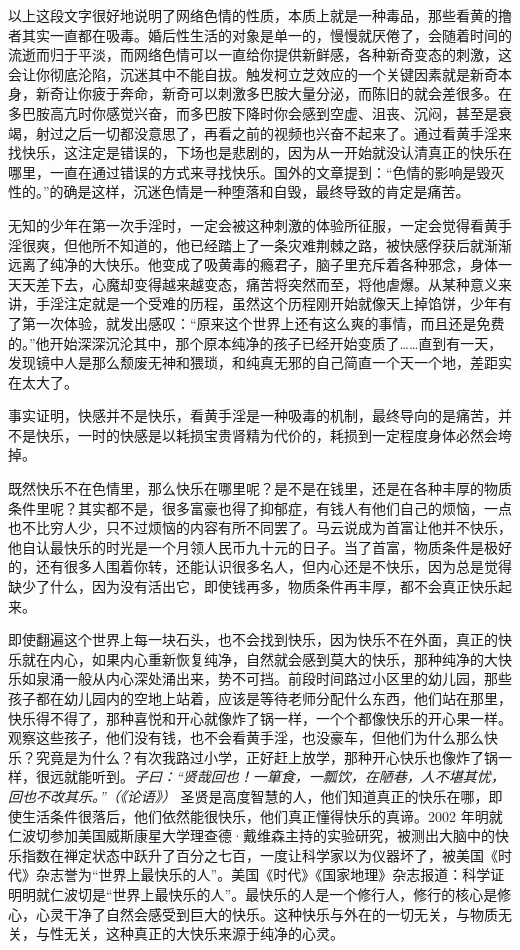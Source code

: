 以上这段文字很好地说明了网络色情的性质，本质上就是一种毒品，那些看黄的撸者其实一直都在吸毒。婚后性生活的对象是单一的，慢慢就厌倦了，会随着时间的流逝而归于平淡，而网络色情可以一直给你提供新鲜感，各种新奇变态的刺激，这会让你彻底沦陷，沉迷其中不能自拔。触发柯立芝效应的一个关键因素就是新奇本身，新奇让你疲于奔命，新奇可以刺激多巴胺大量分泌，而陈旧的就会差很多。在多巴胺高亢时你感觉兴奋，而多巴胺下降时你会感到空虚、沮丧、沉闷，甚至是衰竭，射过之后一切都没意思了，再看之前的视频也兴奋不起来了。通过看黄手淫来找快乐，这注定是错误的，下场也是悲剧的，因为从一开始就没认清真正的快乐在哪里，一直在通过错误的方式来寻找快乐。国外的文章提到：“色情的影响是毁灭性的。”的确是这样，沉迷色情是一种堕落和自毁，最终导致的肯定是痛苦。

无知的少年在第一次手淫时，一定会被这种刺激的体验所征服，一定会觉得看黄手淫很爽，但他所不知道的，他已经踏上了一条灾难荆棘之路，被快感俘获后就渐渐远离了纯净的大快乐。他变成了吸黄毒的瘾君子，脑子里充斥着各种邪念，身体一天天差下去，心魔却变得越来越变态，痛苦将突然而至，将他虐爆。从某种意义来讲，手淫注定就是一个受难的历程，虽然这个历程刚开始就像天上掉馅饼，少年有了第一次体验，就发出感叹：“原来这个世界上还有这么爽的事情，而且还是免费的。”他开始深深沉沦其中，那个原本纯净的孩子已经开始变质了……直到有一天，发现镜中人是那么颓废无神和猥琐，和纯真无邪的自己简直一个天一个地，差距实在太大了。

事实证明，快感并不是快乐，看黄手淫是一种吸毒的机制，最终导向的是痛苦，并不是快乐，一时的快感是以耗损宝贵肾精为代价的，耗损到一定程度身体必然会垮掉。

既然快乐不在色情里，那么快乐在哪里呢？是不是在钱里，还是在各种丰厚的物质条件里呢？其实都不是，很多富豪也得了抑郁症，有钱人有他们自己的烦恼，一点也不比穷人少，只不过烦恼的内容有所不同罢了。马云说成为首富让他并不快乐，他自认最快乐的时光是一个月领人民币九十元的日子。当了首富，物质条件是极好的，还有很多人围着你转，还能认识很多名人，但内心还是不快乐，因为总是觉得缺少了什么，因为没有活出它，即使钱再多，物质条件再丰厚，都不会真正快乐起来。

即使翻遍这个世界上每一块石头，也不会找到快乐，因为快乐不在外面，真正的快乐就在内心，如果内心重新恢复纯净，自然就会感到莫大的快乐，那种纯净的大快乐如泉涌一般从内心深处涌出来，势不可挡。前段时间路过小区里的幼儿园，那些孩子都在幼儿园内的空地上站着，应该是等待老师分配什么东西，他们站在那里，快乐得不得了，那种喜悦和开心就像炸了锅一样，一个个都像快乐的开心果一样。观察这些孩子，他们没有钱，也不会看黄手淫，也没豪车，但他们为什么那么快乐？究竟是为什么？有次我路过小学，正好赶上放学，那种开心快乐也像炸了锅一样，很远就能听到。\textit{子曰：“贤哉回也！一箪食，一瓢饮，在陋巷，人不堪其忧，回也不改其乐。”（《论语》）} 圣贤是高度智慧的人，他们知道真正的快乐在哪，即使生活条件很落后，他们依然能很快乐，他们真正懂得快乐的真谛。2002 年明就仁波切参加美国威斯康星大学理查德·戴维森主持的实验研究，被测出大脑中的快乐指数在禅定状态中跃升了百分之七百，一度让科学家以为仪器坏了，被美国《时代》杂志誉为“世界上最快乐的人”。美国《时代》《国家地理》杂志报道：科学证明明就仁波切是“世界上最快乐的人”。最快乐的人是一个修行人，修行的核心是修心，心灵干净了自然会感受到巨大的快乐。这种快乐与外在的一切无关，与物质无关，与性无关，这种真正的大快乐来源于纯净的心灵。

